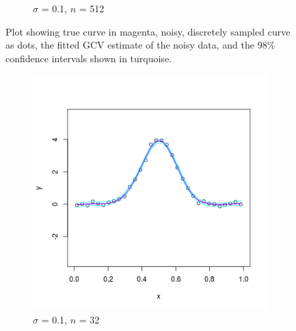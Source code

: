 \documentclass[11pt]{article}
\begin{document}
\begin{homeworkProblem}
\begin{figure}[!ht]
\begin{subfigure}{0.5\textwidth}
\begin{centering}
                \caption{$\sigma$ = 0.1, $n$ = 512}
            \end{centering}
        \end{subfigure}

        \caption{Plot showing true curve in magenta, noisy, discretely sampled
            curve as dots, the fitted GCV estimate of the noisy data, and the
            98\% confidence intervals shown in turquoise. }

    \end{figure}

    \begin{figure}[!ht]
        \begin{subfigure}{0.5\textwidth}
            \begin{centering}
                \includegraphics[width=\linewidth]{smooth_sig01_n32.png}
                \caption{$\sigma$ = 0.1, $n$ = 32}
            \end{centering}
        \end{subfigure}
        \begin{subfigure}{0.5\textwidth}
            \begin{centering}

\end{centering}
\end{subfigure}
\end{figure}
\end{homeworkProblem}
\end{document}
